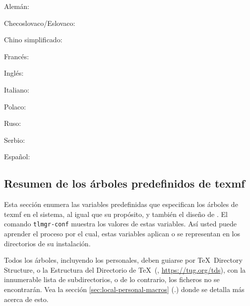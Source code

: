 \documentclass{article}
\begin{document}
\begin{itemize*}
\item{Alemán:} 
\item{Checoslovaco/Eslovaco:} 
\item{Chino simplificado:} 
\item{Francés:} 
\item{Inglés:} 
\item{Italiano:} 
\item{Polaco:} 
\item{Ruso:} 
\item{Serbio:} 
\item{Español:} 
\end{itemize*}

\subsection{Resumen de los árboles predefinidos de texmf}
\label{sec:texmftrees}

Esta sección enumera las variables predefinidas que especifican los
árboles de texmf en el sistema, al igual que su propósito, y también
el diseño de \TL{}. El comando \texttt{tlmgr-conf} muestra los valores
de estas variables. Así usted puede aprender el proceso por el cual,
estas variables aplican o se representan en los directorios de su
instalación.

Todos los árboles, incluyendo los personales, deben guiarse por \TeX\
Directory Structure, o la Estructura del Directorio de \TeX\ (\TDS,
\url{https://tug.org/tds}), con la innumerable lista de
subdirectorios, o de lo contrario, los ficheros no se encontrarán. Vea
la sección \ref{sec:local-personal-macros}
(\p.\pageref{sec:local-personal-macros}) donde se detalla más acerca
de esto.
\end{document}
